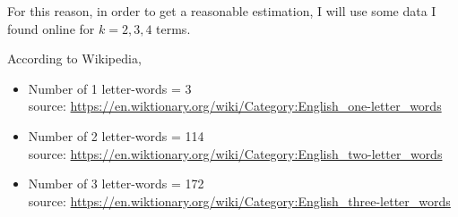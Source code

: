 \documentclass{assignment}
\begin{document}
\begin{enumerate}
  For this reason, in order to get a reasonable estimation, I will use some data I found online for $k=2,3,4$ terms. 

  According to Wikipedia,
  \begin{itemize}
  \item Number of 1 letter-words = 3\\
    source: \url{https://en.wiktionary.org/wiki/Category:English_one-letter_words}
  \item Number of 2 letter-words = 114\\
    source: \url{https://en.wiktionary.org/wiki/Category:English_two-letter_words}
  \item Number of 3 letter-words = 172\\
    source: \url{https://en.wiktionary.org/wiki/Category:English_three-letter_words}
  \end{itemize}


\end{enumerate}
\end{document}
